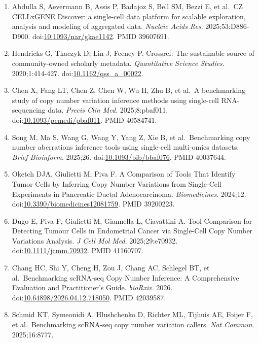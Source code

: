 \documentclass[11pt]{article}
\begin{document}
\begin{enumerate}
  PMID 32302568.
\item
  Abdulla S, Aevermann B, Assis P, Badajoz S, Bell SM, Bezzi E, et
  al.~CZ CELLxGENE Discover: a single-cell data platform for scalable
  exploration, analysis and modeling of aggregated data. \emph{Nucleic
  Acids Res}. 2025;53:D886-D900.
  doi:\href{https://doi.org/10.1093/nar/gkae1142}{10.1093/nar/gkae1142}.
  PMID 39607691.
\item
  Hendricks G, Tkaczyk D, Lin J, Feeney P. Crossref: The sustainable
  source of community-owned scholarly metadata. \emph{Quantitative
  Science Studies}. 2020;1:414-427.
  doi:\href{https://doi.org/10.1162/qss_a_00022}{10.1162/qss\_a\_00022}.
\item
  Chen X, Fang LT, Chen Z, Chen W, Wu H, Zhu B, et al.~A benchmarking
  study of copy number variation inference methods using single-cell
  RNA-sequencing data. \emph{Precis Clin Med}. 2025;8:pbaf011.
  doi:\href{https://doi.org/10.1093/pcmedi/pbaf011}{10.1093/pcmedi/pbaf011}.
  PMID 40584741.
\item
  Song M, Ma S, Wang G, Wang Y, Yang Z, Xie B, et al.~Benchmarking copy
  number aberrations inference tools using single-cell multi-omics
  datasets. \emph{Brief Bioinform}. 2025;26.
  doi:\href{https://doi.org/10.1093/bib/bbaf076}{10.1093/bib/bbaf076}.
  PMID 40037644.
\item
  Oketch DJA, Giulietti M, Piva F. A Comparison of Tools That Identify
  Tumor Cells by Inferring Copy Number Variations from Single-Cell
  Experiments in Pancreatic Ductal Adenocarcinoma. \emph{Biomedicines}.
  2024;12.
  doi:\href{https://doi.org/10.3390/biomedicines12081759}{10.3390/biomedicines12081759}.
  PMID 39200223.
\item
  Dugo E, Piva F, Giulietti M, Giannella L, Ciavattini A. Tool
  Comparison for Detecting Tumour Cells in Endometrial Cancer via
  Single-Cell Copy Number Variations Analysis. \emph{J Cell Mol Med}.
  2025;29:e70932.
  doi:\href{https://doi.org/10.1111/jcmm.70932}{10.1111/jcmm.70932}.
  PMID 41160707.
\item
  Chang HC, Shi Y, Cheng H, Zou J, Chang AC, Schlegel BT, et
  al.~Benchmarking scRNA-seq Copy Number Inference: A Comprehensive
  Evaluation and Practitioner's Guide. \emph{bioRxiv}. 2026.
  doi:\href{https://doi.org/10.64898/2026.04.12.718050}{10.64898/2026.04.12.718050}.
  PMID 42039587.
\item
  Schmid KT, Symeonidi A, Hlushchenko D, Richter ML, Tijhuis AE, Foijer
  F, et al.~Benchmarking scRNA-seq copy number variation callers.
  \emph{Nat Commun}. 2025;16:8777.

\end{enumerate}
\end{document}
